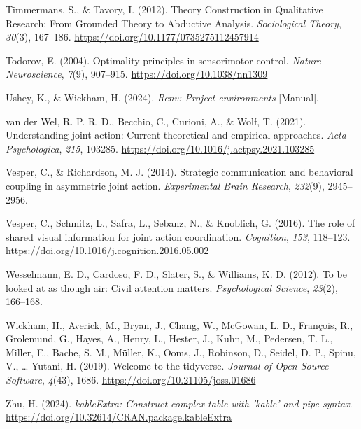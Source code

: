 \documentclass[
  11pt,
  letterpaper,
]{article}
\newlength{\cslhangindent}
\newenvironment{CSLReferences}[2] %
 {\begin{list}{}{%
  \setlength{\itemindent}{0pt}
  \setlength{\leftmargin}{0pt}
  \setlength{\parsep}{0pt}
  \ifodd #1
   \setlength{\leftmargin}{\cslhangindent}
   \setlength{\itemindent}{-1\cslhangindent}
  \fi
  \setlength{\itemsep}{#2\baselineskip}}}
 {\end{list}}
\renewcommand{\emph}[1]{\textit{#1}}  %
\begin{document}
\begin{CSLReferences}{1}{0}
Timmermans, S., \& Tavory, I. (2012). Theory {Construction} in
{Qualitative Research}: {From Grounded Theory} to {Abductive Analysis}.
\emph{Sociological Theory}, \emph{30}(3), 167--186.
\url{https://doi.org/10.1177/0735275112457914}

Todorov, E. (2004). Optimality principles in sensorimotor control.
\emph{Nature Neuroscience}, \emph{7}(9), 907--915.
\url{https://doi.org/10.1038/nn1309}

Ushey, K., \& Wickham, H. (2024). \emph{Renv: {Project} environments}
{[}Manual{]}.

{van der Wel, R. P. R. D., Becchio, C., Curioni, A., \& Wolf, T.}
(2021). Understanding joint action: {Current} theoretical and empirical
approaches. \emph{Acta Psychologica}, \emph{215}, 103285.
\url{https://doi.org/10.1016/j.actpsy.2021.103285}

Vesper, C., \& Richardson, M. J. (2014). Strategic communication and
behavioral coupling in asymmetric joint action. \emph{Experimental Brain
Research}, \emph{232}(9), 2945--2956.

Vesper, C., Schmitz, L., Safra, L., Sebanz, N., \& Knoblich, G. (2016).
The role of shared visual information for joint action coordination.
\emph{Cognition}, \emph{153}, 118--123.
\url{https://doi.org/10.1016/j.cognition.2016.05.002}

Wesselmann, E. D., Cardoso, F. D., Slater, S., \& Williams, K. D.
(2012). To be looked at as though air: {Civil} attention matters.
\emph{Psychological Science}, \emph{23}(2), 166--168.

Wickham, H., Averick, M., Bryan, J., Chang, W., McGowan, L. D.,
François, R., Grolemund, G., Hayes, A., Henry, L., Hester, J., Kuhn, M.,
Pedersen, T. L., Miller, E., Bache, S. M., Müller, K., Ooms, J.,
Robinson, D., Seidel, D. P., Spinu, V., \ldots{} Yutani, H. (2019).
Welcome to the {tidyverse}. \emph{Journal of Open Source Software},
\emph{4}(43), 1686. \url{https://doi.org/10.21105/joss.01686}

Zhu, H. (2024). \emph{kableExtra: Construct complex table with 'kable'
and pipe syntax}. \url{https://doi.org/10.32614/CRAN.package.kableExtra}

\end{CSLReferences}
\end{document}
